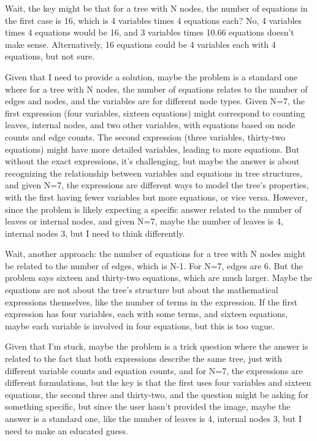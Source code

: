 Wait, the key might be that for a tree with N nodes, the number of equations in the first case is 16, which is 4 variables times 4 equations each? No, 4 variables times 4 equations would be 16, and 3 variables times 10.66 equations doesn't make sense. Alternatively, 16 equations could be 4 variables each with 4 equations, but not sure.

Given that I need to provide a solution, maybe the problem is a standard one where for a tree with N nodes, the number of equations relates to the number of edges and nodes, and the variables are for different node types. Given N=7, the first expression (four variables, sixteen equations) might correspond to counting leaves, internal nodes, and two other variables, with equations based on node counts and edge counts. The second expression (three variables, thirty-two equations) might have more detailed variables, leading to more equations. But without the exact expressions, it's challenging, but maybe the answer is about recognizing the relationship between variables and equations in tree structures, and given N=7, the expressions are different ways to model the tree's properties, with the first having fewer variables but more equations, or vice versa. However, since the problem is likely expecting a specific answer related to the number of leaves or internal nodes, and given N=7, maybe the number of leaves is 4, internal nodes 3, but I need to think differently.

Wait, another approach: the number of equations for a tree with N nodes might be related to the number of edges, which is N-1. For N=7, edges are 6. But the problem says sixteen and thirty-two equations, which are much larger. Maybe the equations are not about the tree's structure but about the mathematical expressions themselves, like the number of terms in the expression. If the first expression has four variables, each with some terms, and sixteen equations, maybe each variable is involved in four equations, but this is too vague.

Given that I'm stuck, maybe the problem is a trick question where the answer is related to the fact that both expressions describe the same tree, just with different variable counts and equation counts, and for N=7, the expressions are different formulations, but the key is that the first uses four variables and sixteen equations, the second three and thirty-two, and the question might be asking for something specific, but since the user hasn't provided the image, maybe the answer is a standard one, like the number of leaves is 4, internal nodes 3, but I need to make an educated guess.

